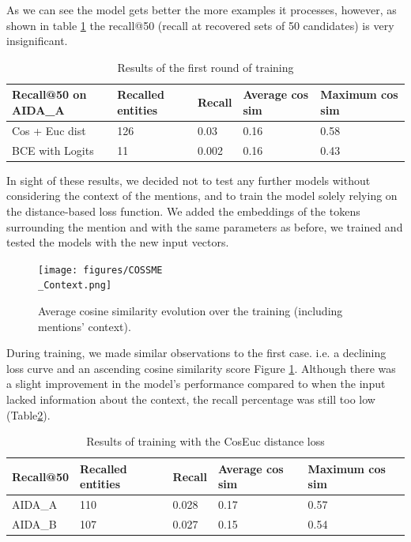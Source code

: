 As we can see the model gets better the more examples it processes, however, as shown in table \ref{1stRound} the recall@50 (recall at recovered sets of 50 candidates) is very insignificant.\newline


\begin{table}[h]
\centering
\begin{tabular}{ |p{3cm}||p{2.5cm}||p{2.5cm}|p{2.5cm}|p{2.5cm}|}
 \hline  
  Recall@50 on AIDA\_A & Recalled entities & Recall & Average cos sim & Maximum cos sim\\
 \hline 
 Cos + Euc dist & 126 & 0.03 & 0.16 & 0.58  \\
 \hline
 BCE with Logits & 11 & 0.002 & 0.16 & 0.43\\
 \hline
\end{tabular}
\caption{Results of the first round of training }
\label{1stRound}
\end{table}

In sight of these results, we decided not to test any further models without considering the context of the mentions, and to train the model solely relying on the distance-based loss function. We added the embeddings of the tokens surrounding the mention and with the same parameters as before, we trained and tested the models with the new input vectors.\newline

\begin{figure}[h]
\centering
\texttt{[image: figures/COSSME\\\_Context.png]}
\caption{Average cosine similarity evolution over the training (including mentions' context).}
\label{training2}
\end{figure}

During training, we made similar observations to the first case. i.e. a declining loss curve and an ascending cosine similarity score Figure \ref{training2}. Although there was a slight improvement in the model's performance compared to when the input lacked information about the context, 
the recall percentage was still too low (Table\ref{2ndRoundA}).

\begin{table}[h]
\centering
\begin{tabular}{ |p{3cm}||p{2.5cm}||p{2.5cm}|p{2.5cm}|p{2.5cm}|}
 \hline   
  Recall@50 & Recalled entities & Recall  & Average cos sim & Maximum cos sim\\
 \hline 
 AIDA\_A & 110 & 0.028 & 0.17 & 0.57 \\
 \hline
 AIDA\_B & 107 & 0.027 & 0.15 & 0.54\\
 \hline
\end{tabular}
\caption{Results of training with the CosEuc distance loss}
\label{2ndRoundA}
\end{table}

